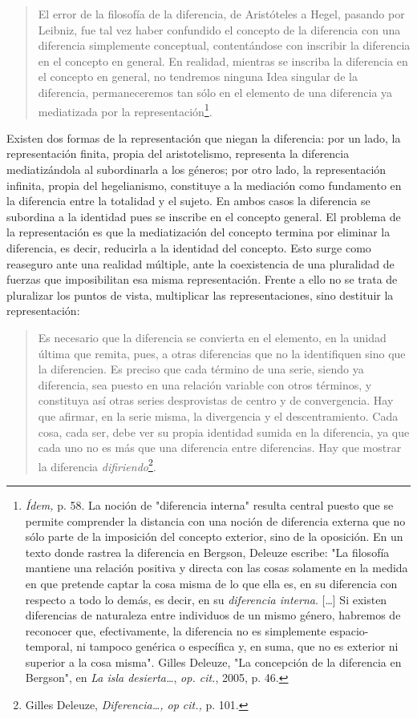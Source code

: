 \documentclass{book}
\begin{document}
\begin{quote}
El error de la filosofía de la diferencia, de Aristóteles a Hegel,
pasando por Leibniz, fue tal vez haber confundido el concepto de la
diferencia con una diferencia simplemente conceptual, contentándose con
inscribir la diferencia en el concepto en general. En realidad, mientras
se inscriba la diferencia en el concepto en general, no tendremos
ninguna Idea singular de la diferencia, permaneceremos tan sólo en el
elemento de una diferencia ya mediatizada por la
representación\footnote{\emph{Ídem,} p. 58. La noción de "diferencia
  interna" resulta central puesto que se permite comprender la distancia
  con una noción de diferencia externa que no sólo parte de la
  imposición del concepto exterior, sino de la oposición. En un texto
  donde rastrea la diferencia en Bergson, Deleuze escribe: "La filosofía
  mantiene una relación positiva y directa con las cosas solamente en la
  medida en que pretende captar la cosa misma de lo que ella es, en su
  diferencia con respecto a todo lo demás, es decir, en su
  \emph{diferencia interna}. {[}\ldots{]} Si existen diferencias de
  naturaleza entre individuos de un mismo género, habremos de reconocer
  que, efectivamente, la diferencia no es simplemente espacio-temporal,
  ni tampoco genérica o específica y, en suma, que no es exterior ni
  superior a la cosa misma". Gilles Deleuze, "La concepción de la
  diferencia en Bergson", en \emph{La isla desierta\ldots{}}, \emph{op.
  cit.}, 2005, p. 46.}.
\end{quote}

Existen dos formas de la representación que niegan la diferencia: por un
lado, la representación finita, propia del aristotelismo, representa la
diferencia mediatizándola al subordinarla a los géneros; por otro lado,
la representación infinita, propia del hegelianismo, constituye a la
mediación como fundamento en la diferencia entre la totalidad y el
sujeto. En ambos casos la diferencia se subordina a la identidad pues se
inscribe en el concepto general. El problema de la representación es que
la mediatización del concepto termina por eliminar la diferencia, es
decir, reducirla a la identidad del concepto. Esto surge como reaseguro
ante una realidad múltiple, ante la coexistencia de una pluralidad de
fuerzas que imposibilitan esa misma representación. Frente a ello no se
trata de pluralizar los puntos de vista, multiplicar las
representaciones, sino destituir la representación:

\begin{quote}
Es necesario que la diferencia se convierta en el elemento, en la unidad
última que remita, pues, a otras diferencias que no la identifiquen sino
que la diferencien. Es preciso que cada término de una serie, siendo ya
diferencia, sea puesto en una relación variable con otros términos, y
constituya así otras series desprovistas de centro y de convergencia.
Hay que afirmar, en la serie misma, la divergencia y el descentramiento.
Cada cosa, cada ser, debe ver su propia identidad sumida en la
diferencia, ya que cada uno no es más que una diferencia entre
diferencias. Hay que mostrar la diferencia \emph{difiriendo}\footnote{Gilles
  Deleuze, \emph{Diferencia\ldots, op cit.,} p. 101.}.
\end{quote}
\end{document}
